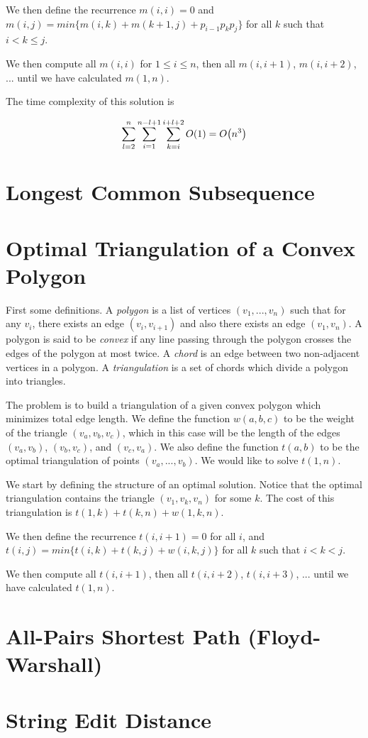 We then define the recurrence $m(i,i) = 0$ and $m(i,j) = min \{ m(i,k) +
m(k+1,j) + p_{i-1}p_kp_j \}$ for all $k$ such that $i < k \leq j$.

We then compute all $m(i,i)$ for $1 \leq i \leq n$, then all
$m(i,i+1)$, $m(i,i+2)$, ... until we have calculated $m(1,n)$.

The time complexity of this solution is

\[
  \displaystyle\sum\limits_{l=2}^{n}\displaystyle\sum\limits_{i=1}^{n-l+1}\displaystyle\sum\limits_{k=i}^{i+l+2}O\!\left(1\right) = O\!\left(n^3\right)
\]

\section{Longest Common Subsequence}

\section{Optimal Triangulation of a Convex Polygon}


First some definitions.  A \emph{polygon} is a list of vertices
$(v_1,...,v_n)$ such that for any $v_i$, there exists an edge
$(v_i,v_{i+1})$ and also there exists an edge $(v_1,v_n)$.  A polygon
is said to be \emph{convex} if any line passing through the polygon
crosses the edges of the polygon at most twice.  A \emph{chord} is an
edge between two non-adjacent vertices in a polygon.  A
\emph{triangulation} is a set of chords which divide a polygon into
triangles.

The problem is to build a triangulation of a given convex polygon
which minimizes total edge length.  We define the function $w(a,b,c)$
to be the weight of the triangle $(v_a,v_b,v_c)$, which in this case
will be the length of the edges $(v_a,v_b)$, $(v_b,v_c)$, and
$(v_c,v_a)$.  We also define the function $t(a,b)$ to be the optimal
triangulation of points $(v_a,...,v_b)$.  We would like to solve
$t(1,n)$.

We start by defining the structure of an optimal solution.  Notice
that the optimal triangulation contains the triangle $(v_1,v_k,v_n)$
for some $k$.  The cost of this triangulation is $t(1,k) + t(k,n) +
w(1,k,n)$.

We then define the recurrence $t(i,i+1) = 0$ for all $i$, and $t(i,j)
= min \{ t(i,k) + t(k,j) + w(i,k,j) \}$ for all $k$ such that $i < k < j$.

We then compute all $t(i,i+1)$, then all $t(i,i+2)$, $t(i,i+3)$,
... until we have calculated $t(1,n)$.

\hypertarget{sec:floyd_warshall}{\section{All-Pairs Shortest Path (Floyd-Warshall)}}

\section{String Edit Distance}

